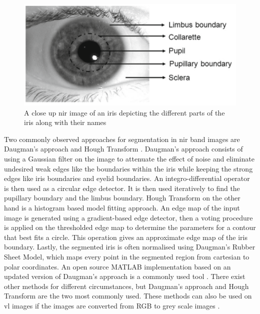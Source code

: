 \begin{figure}[H]
\centering
\includegraphics[width=\textwidth]{figures/iris_naming.png} 
\caption{A close up \gls{nir} image of an iris depicting the different parts of the iris along with their names \citep{Bowyer2016b}}
\label{fig:iris_naming}
\end{figure}

Two commonly observed approaches for segmentation in \gls{nir} band images are Daugman's approach and Hough Transform \citep{Daugman1993, Saha2017,Rattani2017,Khan2017a,Luhadiya2017,Uka2017}. Daugman's approach consists of using a Gaussian filter on the image to attenuate the effect of noise and eliminate undesired weak edges like the boundaries within the iris while keeping the strong edges like iris boundaries and eyelid boundaries. An integro-differential operator is then used as a circular edge detector. It is then used iteratively to find the pupillary boundary and the limbus boundary. Hough Transform on the other hand is a histogram based model fitting approach. An edge map of the input image is generated using a gradient-based edge detector, then a voting procedure is applied on the thresholded edge map to determine the parameters for a contour that best fits a circle. This operation gives an approximate edge map of the iris boundary. Lastly, the segmented iris is often normalised using Daugman's Rubber Sheet Model, which maps every point in the segmented region from cartesian to polar coordinates. An open source MATLAB implementation based on an updated version of Daugman's approach is a commonly used tool \citep{Percy}. There exist other methods for different circumstances, but Daugman's approach and Hough Transform are the two most commonly used. These methods can also be used on \gls{vl} images if the images are converted from RGB to grey scale images \citep{Bowyer2016}. 

